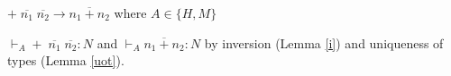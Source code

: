 \begin{case}
$+\;\overline{n_{1}}\;\overline{n_{2}}\rightarrow\overline{n_{1}+n_{2}}$ where $A\in\lbrace H,M\rbrace$

$\vdash_{A}+\;\overline{n_{1}}\;\overline{n_{2}}:N$ and $\vdash_{A}\overline{n_{1}+n_{2}}:N$ by inversion (Lemma \ref{i}) and uniqueness of types (Lemma \ref{uot}).
\end{case}